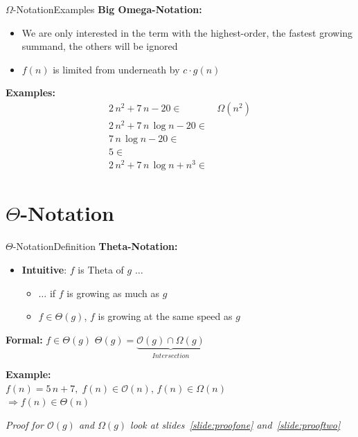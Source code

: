 \begin{frame}{$\Omega$-Notation}{Examples}
  \textbf{Big Omega-Notation:}
  \begin{itemize}
    \item
      We are only interested in the term with the highest-order,
      the fastest growing summand, the others will be ignored
    \item
      $f(n)$ is limited {\color{Mittel-Blau}from underneath} by
      $c \cdot g(n)$
  \end{itemize}
  \textbf{Examples:}
  \begin{align*}
    2 \, n^2 + 7 \, n - 20 \in & \,\Omega(n^2)\\
    2 \, n^2 + 7 \, n \, \log n - 20 \in & {}\\
    7 \, n \, \log n - 20 \in & {}\\
    5 \in & {}\\
    2 \, n^2 + 7 \, n \, \log n + n^3 \in & {}
  \end{align*}
\end{frame}


\section{\texorpdfstring{$\Theta$}{Theta}-Notation}

\begin{frame}{$\Theta$-Notation}{Definition}
  \textbf{Theta-Notation:}
  \begin{itemize}
    \item
      \textbf{Intuitive}: $f$ is Theta of $g$ $\ldots$
      \begin{itemize}
        \item
          $\ldots$ if $f$ is growing as much as $g$
        \item
          $f \in \Theta(g)$, $f$ is growing at the same speed as $g$
       \end{itemize}
  \end{itemize}
  \begin{block}{\textbf{Formal:} $f \in \Theta(g)$}
    $\Theta(g) = \underbrace{\mathcal O(g) \cap \Omega(g)}_{Intersection}$
  \end{block}
  \textbf{Example:}\\
  \hspace*{1.5em}$f(n) = 5 \, n + 7, \;
    f(n) \in \mathcal{O}(n), \,
    f(n) \in \Omega(n)$\\
  \hspace*{3.0em}$\Rightarrow f(n) \in \Theta(n)$\\[0.5em]
  \begin{center}
   \textit{Proof for $\mathcal{O}(g)$ and $\Omega(g)$ look at
     slides~\ref{slide:proofone} and~\ref{slide:prooftwo}}
  \end{center}
\end{frame}


